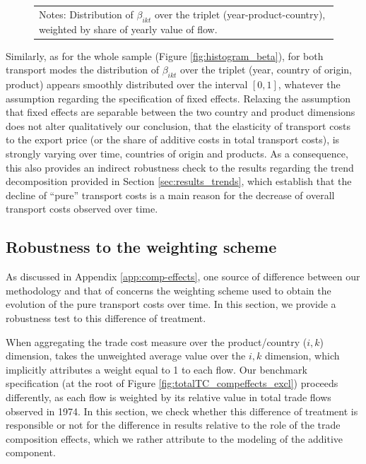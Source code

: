 \documentclass[a4paper,11pt]{article}
\begin{document}
\begin{figure}[htbp]
\begin{center}
\begin{tabular}{cc}
\multicolumn{2}{l}{{\footnotesize Notes: Distribution of $\beta_{ikt}$ over the triplet (year-product-country), weighted by share of yearly value of flow.}}\\
\end{tabular}
\end{center}
\end{figure}

Similarly, as for the whole sample (Figure \ref{fig:histogram_beta}), for both transport modes the distribution of $\beta_{ikt}$ over the triplet (year, country of origin, product) appears smoothly distributed over the interval $[0,1]$, whatever the assumption regarding the specification of fixed effects.
Relaxing the assumption that fixed effects are separable between the two country and product dimensions does not alter qualitatively our conclusion, that the elasticity of transport costs to the export price (or the share of additive costs in total transport costs), is strongly varying over time, countries of origin and products.
As a consequence, this also provides an indirect robustness check to the results regarding the trend decomposition provided in Section \ref{sec:results_trends}, which establish that the decline of ``pure'' transport costs is a main reason for the decrease of overall transport costs observed over time.


\subsection{Robustness to the weighting scheme }

As discussed in Appendix \ref{app:comp-effects}, one source of difference between our methodology and that of \cite{hummels2007} concerns the weighting scheme used to obtain the evolution of the pure transport costs over time.
In this section, we provide a robustness test to this difference of treatment.\smallskip

When aggregating the trade cost measure over the product/country ($i,k$) dimension, \cite{hummels2007} takes the unweighted average value over the $i,k$ dimension, which implicitly attributes a weight equal to 1 to each flow.
Our benchmark specification  (at the root of Figure \ref{fig:totalTC_compeffects_excl}) proceeds differently, as each flow is weighted by its relative value in total trade flows observed in 1974.
In this section, we check whether this difference of treatment is responsible or not for the difference in results relative to the role of the trade composition effects, which we rather attribute to the modeling of the additive component.
\end{document}
